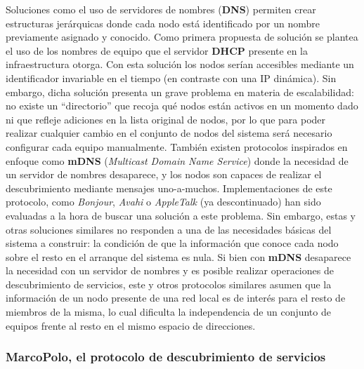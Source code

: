 Soluciones como el uso de servidores de nombres (\textbf{DNS}) permiten crear estructuras jerárquicas donde cada nodo está identificado por un nombre previamente asignado y conocido. Como primera propuesta de solución se plantea el uso de los nombres de equipo que el servidor \textbf{DHCP} presente en la infraestructura otorga. Con esta solución los nodos serían accesibles mediante un identificador invariable en el tiempo (en contraste con una IP dinámica). Sin embargo, dicha solución presenta un grave problema en materia de escalabilidad: no existe un ``directorio'' que recoja qué nodos están activos en un momento dado ni que refleje adiciones en la lista original de nodos, por lo que para poder realizar cualquier cambio en el conjunto de nodos del sistema será necesario configurar cada equipo manualmente. También existen protocolos inspirados en enfoque como \textbf{mDNS} (\textit{Multicast Domain Name Service}) donde la necesidad de un servidor de nombres desaparece, y los nodos son capaces de realizar el descubrimiento mediante mensajes uno-a-muchos\cite{rfc6762}. Implementaciones de este protocolo, como \textit{Bonjour}, \textit{Avahi} o \textit{AppleTalk} (ya descontinuado) han sido evaluadas a la hora de buscar una solución a este problema. Sin embargo, estas y otras soluciones similares no responden a una de las necesidades básicas del sistema a construir: la condición de que la información que conoce cada nodo sobre el resto en el arranque del sistema es nula. Si bien con \textbf{mDNS} desaparece la necesidad con un servidor de nombres y es posible realizar operaciones de descubrimiento de servicios, este y otros protocolos similares asumen que la información de un nodo presente de una red local es de interés para el resto de miembros de la misma, lo cual dificulta la independencia de un conjunto de equipos frente al resto en el mismo espacio de direcciones.


\subsubsection{MarcoPolo, el protocolo de descubrimiento de servicios}
\label{marcopolo}

